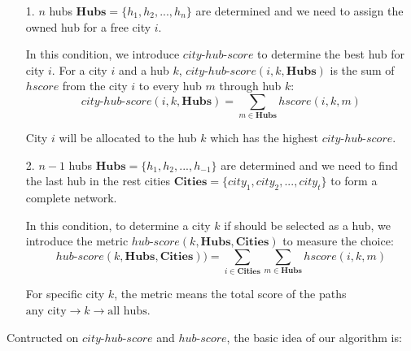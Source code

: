 \documentclass{llncs}
\begin{document}
\begin{itemize}
	\item[1.] $n$ hubs $\mathbf{Hubs}= \{h_1,h_2,...,h_n\}$ are determined and we need to assign the owned hub for a free city $i$.
	
	In this condition, we introduce $city\text{-}hub\text{-}score$ to determine the best hub for city $i$. For a city $i$ and a hub $k$, $city\text{-}hub\text{-}score(i,k, \mathbf{Hubs})$ is the sum of $hscore$ from the city $i$ to every hub $m$ through hub $k$:
	\begin{equation}
	city\text{-}hub\text{-}score(i,k,\mathbf{Hubs}) = \sum_{m \in \mathbf{Hubs}} hscore(i,k,m)  
	\end{equation}
	
	City $i$ will be allocated to the hub $k$ which has the highest $city\text{-}hub\text{-}score$.
	
	\item[2.] $n-1$ hubs $\mathbf{Hubs}= \{h_1,h_2,...,h_{-1}\}$ are determined and we need to find the last hub in the
	rest cities $\mathbf{Cities}=\{city_1,city_2,...,city_t\}$ to form a complete network.
	
	In this condition, to determine a city $k$ if should be selected as a hub, we introduce the metric $hub\text{-}score(k,\mathbf{Hubs},\mathbf{Cities})$ to measure the choice:
	\begin{equation}
		hub\text{-}score(k,\mathbf{Hubs},\mathbf{Cities})) = \sum_{i\in \mathbf{Cities}} \sum_{m \in \mathbf{Hubs}} hscore(i,k,m)  
	\end{equation}
	
	For specific city $k$, the metric means the total score of the paths $\text{any city} \rightarrow k \rightarrow \text{all hubs}$.
\end{itemize}

Contructed on $city\text{-}hub\text{-}score$ and $hub\text{-}score$, the basic idea of our algorithm is:
\end{document}
